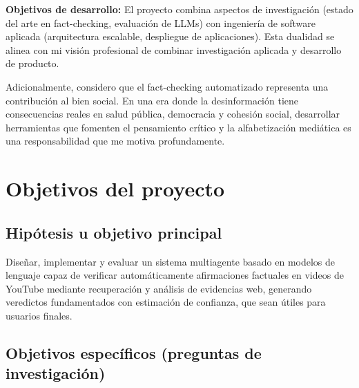 \documentclass[12pt,a4paper]{article}
\begin{document}
\textbf{Objetivos de desarrollo:} El proyecto combina aspectos de investigación (estado del arte en fact-checking, evaluación de LLMs) con ingeniería de software aplicada (arquitectura escalable, despliegue de aplicaciones). Esta dualidad se alinea con mi visión profesional de combinar investigación aplicada y desarrollo de producto.

Adicionalmente, considero que el fact-checking automatizado representa una contribución al bien social. En una era donde la desinformación tiene consecuencias reales en salud pública, democracia y cohesión social, desarrollar herramientas que fomenten el pensamiento crítico y la alfabetización mediática es una responsabilidad que me motiva profundamente.

\section{Objetivos del proyecto}

\subsection{Hipótesis u objetivo principal}

Diseñar, implementar y evaluar un sistema multiagente basado en modelos de lenguaje capaz de verificar automáticamente afirmaciones factuales en videos de YouTube mediante recuperación y análisis de evidencias web, generando veredictos fundamentados con estimación de confianza, que sean útiles para usuarios finales.

\subsection{Objetivos específicos (preguntas de investigación)}
\end{document}
